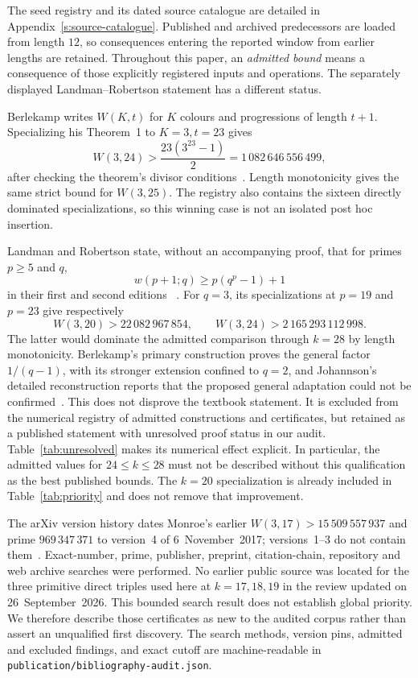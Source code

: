 The seed registry and its dated source catalogue are detailed in
Appendix~\ref{s:source-catalogue}. Published and archived predecessors are
loaded from length $12$, so consequences entering the reported window from
earlier lengths are retained. Throughout this paper, an \emph{admitted bound}
means a consequence of those explicitly registered inputs and operations.
The separately displayed Landman--Robertson statement has a different status.

Berlekamp writes $W(K,t)$ for $K$ colours and progressions of length $t+1$.
Specializing his Theorem~1 to $K=3,t=23$ gives
\begin{equation}\label{eq:berlekamp-24}
  W(3,24)>\frac{23(3^{23}-1)}{2}
           =1\,082\,646\,556\,499,
\end{equation}
after checking the theorem's divisor conditions~\cite{Berlekamp1968}. Length
monotonicity gives the same strict bound for $W(3,25)$. The registry also
contains the sixteen directly dominated specializations, so this winning case is not an
isolated post hoc insertion.

Landman and Robertson state, without an accompanying proof, that for primes
$p\ge5$ and $q$,
\[
  w(p+1;q)\ge p(q^p-1)+1
\]
in their first and second editions~\cite[Theorem~2.19, p.~38]{LandmanRobertson2004}
\cite[Theorem~2.21, p.~43]{LandmanRobertson2014}.
For $q=3$, its specializations at $p=19$ and $p=23$ give respectively
\[
 W(3,20)>22\,082\,967\,854,
 \qquad W(3,24)>2\,165\,293\,112\,998.
\]
The latter would dominate the admitted comparison through $k=28$ by length
monotonicity. Berlekamp's primary construction proves the general factor
$1/(q-1)$, with its stronger extension confined to $q=2$, and Johannson's
detailed reconstruction reports that the proposed general adaptation could
not be confirmed~\cite[pp.~88--90]{Johannson2007}.
This does not disprove the textbook statement. It is excluded from the numerical registry
of admitted constructions and certificates, but retained as a
published statement with unresolved proof status in our audit.
Table~\ref{tab:unresolved} makes its numerical effect explicit. In particular,
the admitted values for $24\le k\le28$ must not be described without this
qualification as the best published bounds. The $k=20$ specialization is
already included in Table~\ref{tab:priority} and does not remove that improvement.



The arXiv version history dates Monroe's earlier
$W(3,17)>15\,509\,557\,937$ and prime $969\,347\,371$ to version~4 of
6~November~2017; versions~1--3 do not contain them~\cite{Monroe2017v4}.
Exact-number, prime, publisher, preprint, citation-chain, repository and web
archive searches were performed. No earlier public source was located for the
three primitive direct triples used here at $k=17,18,19$ in the review updated
on 26~September~2026. This bounded search result does not establish global priority. We therefore describe those certificates as new to
the audited corpus rather than assert an unqualified first discovery. The
search methods, version pins, admitted and excluded findings, and exact cutoff
are machine-readable in \texttt{publication/bibliography-audit.json}.

